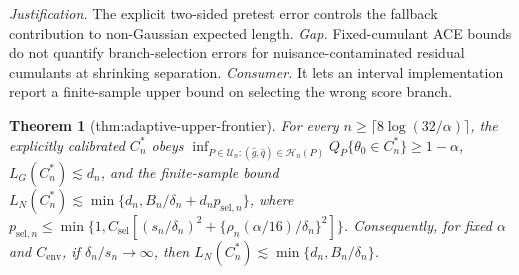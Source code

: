 \documentclass{article}
\newtheorem{theorem}{Theorem}
\begin{document}
\par\smallskip\noindent \textit{Justification.} The explicit two-sided pretest error controls the fallback contribution to non-Gaussian expected length. \textit{Gap.} Fixed-cumulant ACE bounds do not quantify branch-selection errors for nuisance-contaminated residual cumulants at shrinking separation. \textit{Consumer.} It lets an interval implementation report a finite-sample upper bound on selecting the wrong score branch.

\begin{theorem}[thm:adaptive-upper-frontier]\label{thm:adaptive-upper-frontier}
For every \(n\ge\lceil8\log(32/\alpha)\rceil\), the explicitly calibrated \(C_n^*\) obeys \(\inf_{P\in\mathcal U_n:(\widehat g,\widehat q)\in\mathcal H_n(P)}Q_P\{\theta_0\in C_n^*\}\ge1-\alpha\), \(L_G(C_n^*)\lesssim d_n\), and the finite-sample bound \(L_N(C_n^*)\lesssim\min\{d_n,B_n/\delta_n+d_np_{\mathrm{sel},n}\}\), where \(p_{\mathrm{sel},n}\le\min\{1,C_{\mathrm{sel}}[(s_n/\delta_n)^2+\{\rho_n(\alpha/16)/\delta_n\}^2]\}\). Consequently, for fixed \(\alpha\) and \(C_{\mathrm{env}}\), if \(\delta_n/s_n\to\infty\), then \(L_N(C_n^*)\lesssim\min\{d_n,B_n/\delta_n\}\).
\end{theorem}
\end{document}
